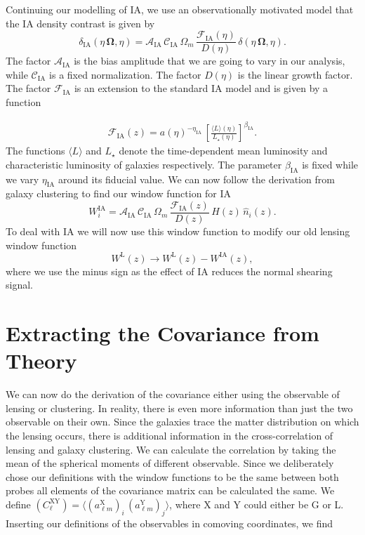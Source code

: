 \documentclass[../main.tex]{subfiles}
\begin{document}
\newline
Continuing our modelling of IA, we use an observationally motivated model that the IA density contrast is given by 
\begin{equation}
    \delta_\mathrm{IA}(\eta\,\boldsymbol{\Omega},\eta) = \mathcal{A}_\mathrm{IA}\,\mathcal{C}_\mathrm{IA}\,\Omega_m\,\frac{\mathcal{F}_\mathrm{IA}(\eta)}{D(\eta)}\,\delta(\eta\, \boldsymbol{\Omega},\eta).
\end{equation}
The factor $\mathcal{A}_\mathrm{IA}$ is the bias amplitude that we are going to vary in our analysis, while $\mathcal{C}_\mathrm{IA}$ is a fixed normalization. The factor $D(\eta)$ is the linear growth factor. The factor $\mathcal{F}_\mathrm{IA}$ is an extension to the standard IA model and is given by a function 

\begin{align}
    \mathcal{F}_\mathrm{IA}(z) = a(\eta)^{-\eta_\mathrm{IA}}\,\left[\frac{\langle L \rangle(\eta)}{L_\star(\eta)}\right]^{\beta_\mathrm{IA}}.
\end{align}
The functions $\langle L \rangle$ and $L_\star$ denote the time-dependent mean luminosity and characteristic luminosity of galaxies respectively. The parameter $\beta_\mathrm{IA}$ is fixed while we vary $\eta_\mathrm{IA}$ around its fiducial value. We can now follow the derivation from galaxy clustering to find our window function for IA\begin{equation}
    W_i^\mathrm{IA} =  \mathcal{A}_\mathrm{IA}\,\mathcal{C}_\mathrm{IA}\,\Omega_m\,\frac{\mathcal{F}_\mathrm{IA}(z)}{D(z)}\,H(z)\,\hat{n}_i(z).
\end{equation}
To deal with IA we will now use this window function to modify our old lensing window function\begin{equation}
    W^\mathrm{L}(z) \to W^\mathrm{L}(z) - W^\mathrm{IA}(z),
\end{equation}
where we use the minus sign as the effect of IA reduces the normal shearing signal.
\section{Extracting the Covariance from Theory}
We can now do the derivation of the covariance either using the observable of lensing or clustering. In reality, there is even more information than just the two observable on their own. Since the galaxies trace the matter distribution on which the lensing occurs, there is additional information in the cross-correlation of lensing and galaxy clustering. We can calculate the correlation by taking the mean of the spherical moments of different observable. Since we deliberately chose our definitions with the window functions to be the same between both probes all elements of the covariance matrix can be calculated the same. We define $\left(C^\mathrm{XY}_{\ell}\right)=\langle \left(a^\mathrm{X}_{\ell m}\right)_i \, \left(a^\mathrm{Y}_{\ell m}\right)_j\rangle$, where X and Y could either be G or L. Inserting our definitions of the observables in comoving coordinates, we find 
\end{document}
